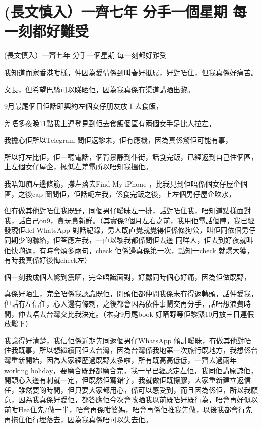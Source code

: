 \chapter{(長文慎入）一齊七年 分手一個星期 每一刻都好難受}

(長文慎入）一齊七年 分手一個星期 每一刻都好難受

我知道而家香港咁樣，仲因為愛情係到叫春好抵屌，好對唔住，但我真係好痛苦。

文長，但希望巴絲可以睇晒佢，因為我真係冇渠道講晒出黎。

9月最尾個日佢話即興約左個女仔朋友放工去食飯，

差唔多夜晚11點我上連登見到佢去食飯個區有兩個女手足比人拉左，

我擔心佢所以Telegram 問佢返黎未，佢冇應機，因為真係驚佢可能有事，

所以打左比佢，佢一聽電話，個背景靜到仆街，話食完飯，已經返到自己住個區，上左個女仔屋企，擺低左差電所以唔知我搵佢。

我唔知痴左邊條筋，㩒左落去Find My iPhone ，比我見到佢唔係個女仔屋企個區，之後cap 圖問佢，佢話呃左我，係食完飯之後，上左個男仔屋企吹水，

但冇做其他對唔住我既野，同個男仔曖昧左一排，話對唔住我，唔知道點樣面對我，話自己on9，貪玩貪新鮮。（其實係2個月左右之前，我用佢電話個陣，我已經發現佢del WhatsApp 對話紀錄，男人既直覺就覺得佢係條狗公，叫佢同依個男仔同期少啲聯絡，佢答應左我，一直以黎我都係問佢去邊 同咩人，佢去到好夜就叫佢快啲返，有時會煩多兩句，check 佢係邊真係第一次，點知一check 就爆大獲，有時我真係好後悔check左）

個一刻我成個人驚到震晒，完全唔識面對，好嬲同時個心好痛，因為佢做既野，

真係好陌生，完全唔係我認識既佢，開頭佢都仲問我係未冇得返轉頭，話仲愛我，但話冇左信任，心入邊有條刺，之後都會因為依件事鬧交再分手，話唔想浪費時間，仲去唔去台灣交比我決定。（本身9月尾book 好晒野等佢黎緊10月放三日連假放鬆下）

我諗得好清楚，我信佢係近期先同返個男仔WhatsApp 傾計曖昧，冇做其他對唔住我既事，所以想繼續同佢去台灣，因為台灣係我地第一次旅行既地方，我想係台灣重新開始，因為大家經歷過既野太多啦，所有既高高低低，一齊去過兩年working holiday，要磨合既野都磨合完，我一早已經認定左佢，我同佢講原諒佢，開頭心入邊有刺就一定，但既然佢寫錯字，我就做佢既擦膠，大家重新建立返信任，雖然要啲時間，但只要大家都用心，係可以感受到，而且因為係佢，所以我願意，因為我真係好愛佢，都答應佢今次會改晒我以前既唔好既行為，唔會再好似以前咁Hea住先/做一半，唔會再係咁婆媽，唔會再係佢推我先做，以後我都會行先再拖住佢行埋落去，因為我真係唔可以失去佢。

